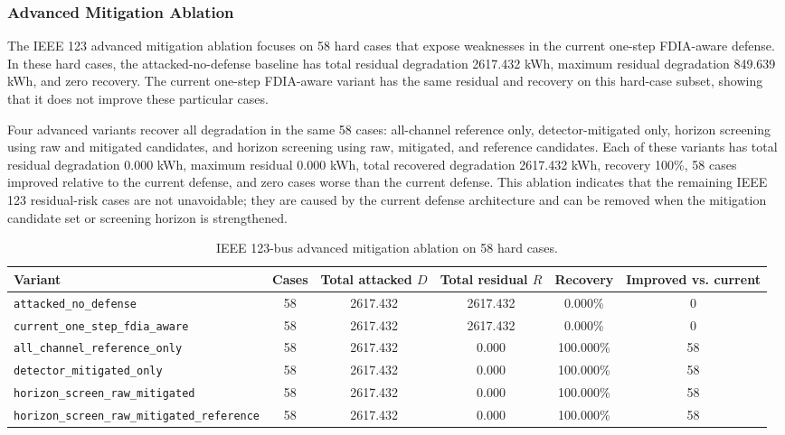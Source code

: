 \subsubsection{Advanced Mitigation Ablation}
\label{subsubsec:ieee123_advanced_mitigation}

The IEEE 123 advanced mitigation ablation focuses on 58 hard cases that expose weaknesses in the current one-step FDIA-aware defense. In these hard cases, the attacked-no-defense baseline has total residual degradation 2617.432 kWh, maximum residual degradation 849.639 kWh, and zero recovery. The current one-step FDIA-aware variant has the same residual and recovery on this hard-case subset, showing that it does not improve these particular cases.

Four advanced variants recover all degradation in the same 58 cases: all-channel reference only, detector-mitigated only, horizon screening using raw and mitigated candidates, and horizon screening using raw, mitigated, and reference candidates. Each of these variants has total residual degradation 0.000 kWh, maximum residual 0.000 kWh, total recovered degradation 2617.432 kWh, recovery 100\%, 58 cases improved relative to the current defense, and zero cases worse than the current defense. This ablation indicates that the remaining IEEE 123 residual-risk cases are not unavoidable; they are caused by the current defense architecture and can be removed when the mitigation candidate set or screening horizon is strengthened.

\begin{table}[t]
\centering
\caption{IEEE 123-bus advanced mitigation ablation on 58 hard cases.}
\label{tab:ieee123_advanced_mitigation}
\scriptsize
\begin{tabular}{lccccc}
\hline
Variant & Cases & Total attacked $D$ & Total residual $R$ & Recovery & Improved vs. current \\
\hline
\texttt{attacked\_no\_defense} & 58 & 2617.432 & 2617.432 & 0.000\% & 0 \\
\texttt{current\_one\_step\_fdia\_aware} & 58 & 2617.432 & 2617.432 & 0.000\% & 0 \\
\texttt{all\_channel\_reference\_only} & 58 & 2617.432 & 0.000 & 100.000\% & 58 \\
\texttt{detector\_mitigated\_only} & 58 & 2617.432 & 0.000 & 100.000\% & 58 \\
\texttt{horizon\_screen\_raw\_mitigated} & 58 & 2617.432 & 0.000 & 100.000\% & 58 \\
\texttt{horizon\_screen\_raw\_mitigated\_reference} & 58 & 2617.432 & 0.000 & 100.000\% & 58 \\
\hline
\end{tabular}
\end{table}

